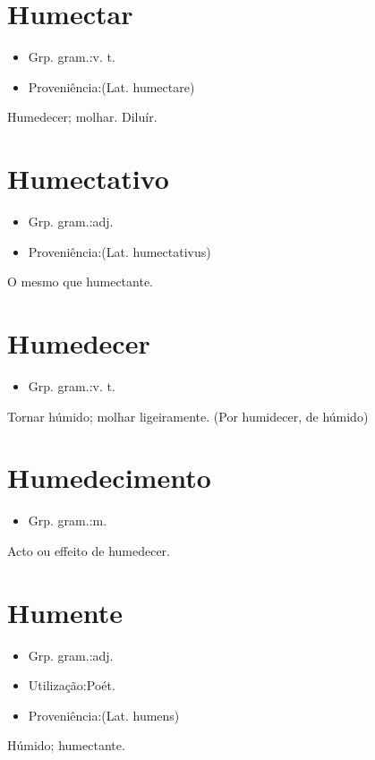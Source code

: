 \documentclass{article}
\begin{document}
\section{Humectar}
\begin{itemize}
\item {Grp. gram.:v. t.}
\end{itemize}
\begin{itemize}
\item {Proveniência:(Lat. \textunderscore humectare\textunderscore )}
\end{itemize}
Humedecer; molhar.
Diluír.
\section{Humectativo}
\begin{itemize}
\item {Grp. gram.:adj.}
\end{itemize}
\begin{itemize}
\item {Proveniência:(Lat. \textunderscore humectativus\textunderscore )}
\end{itemize}
O mesmo que \textunderscore humectante\textunderscore .
\section{Humedecer}
\begin{itemize}
\item {Grp. gram.:v. t.}
\end{itemize}
Tornar húmido; molhar ligeiramente.
(Por \textunderscore humidecer\textunderscore , de \textunderscore húmido\textunderscore )
\section{Humedecimento}
\begin{itemize}
\item {Grp. gram.:m.}
\end{itemize}
Acto ou effeito de humedecer.
\section{Humente}
\begin{itemize}
\item {Grp. gram.:adj.}
\end{itemize}
\begin{itemize}
\item {Utilização:Poét.}
\end{itemize}
\begin{itemize}
\item {Proveniência:(Lat. \textunderscore humens\textunderscore )}
\end{itemize}
Húmido; humectante.
\end{document}
